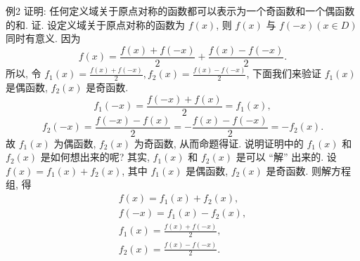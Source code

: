 例2 证明: 任何定义域关于原点对称的函数都可以表示为一个奇函数和一个偶函数的和.
证.
设定义域关于原点对称的函数为 $f(x)$, 则 $f(x)$ 与 $f(-x)(x \in D)$ 同时有意义.
因为
$$
f(x)=\frac{f(x)+f(-x)}{2}+\frac{f(x)-f(-x)}{2} .
$$
所以, 令 $f_1(x)=\frac{f(x)+f(-x)}{2}, f_2(x)=\frac{f(x)-f(-x)}{2}$, 下面我们来验证 $f_1(x)$ 是偶函数, $f_2(x)$ 是奇函数.
$$
f_1(-x)=\frac{f(-x)+f(x)}{2}=f_1(x),
$$
$$
f_2(-x)=\frac{f(-x)-f(x)}{2}=-\frac{f(x)-f(-x)}{2}=-f_2(x) .
$$
故 $f_1(x)$ 为偶函数, $f_2(x)$ 为奇函数, 从而命题得证.
说明证明中的 $f_1(x)$ 和 $f_2(x)$ 是如何想出来的呢? 其实, $f_1(x)$ 和 $f_2(x)$ 是可以 “解” 出来的.
设 $f(x)=f_1(x)+f_2(x)$, 其中 $f_1(x)$ 是偶函数, $f_2(x)$ 是奇函数.
则解方程组, 得
$$
\begin{gathered}
f(x)=f_1(x)+f_2(x), \\
f(-x)=f_1(x)-f_2(x), \\
f_1(x)=\frac{f(x)+f(-x)}{2}, \\
f_2(x)=\frac{f(x)-f(-x)}{2} .
\end{gathered}
$$



